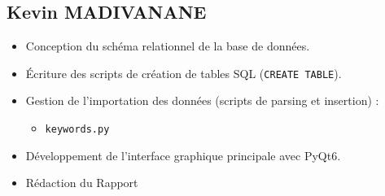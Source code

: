 \documentclass[12pt]{article}
\begin{document}
\subsection{Kevin MADIVANANE}
\begin{itemize}
    \item Conception du schéma relationnel de la base de données.
    \item Écriture des scripts de création de tables SQL (\texttt{CREATE TABLE}).
    \item Gestion de l'importation des données (scripts de parsing et insertion) :
    \begin{itemize}
        \item \texttt{keywords.py}
    \end{itemize}
    \item Développement de l'interface graphique principale avec PyQt6.
    \item Rédaction du Rapport 
\end{itemize}
\end{document}

